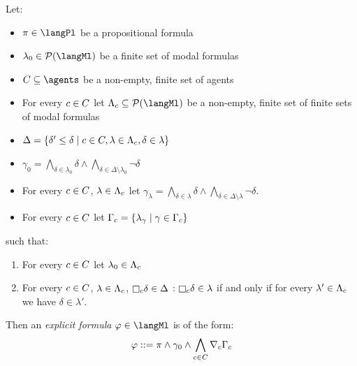 \begin{definition}\label{explicit-formulas}
Let:
\begin{itemize}
    \item $\pi \in \langPl$ be a propositional formula
    \item $\lambda_0 \in \powerset(\langMl)$ be a finite set of modal formulas
    \item $\agentsC \subseteq \agents$ be a non-empty, finite set of agents
    \item For every $c \in C$ let $\Lambda_\agentC \subseteq \powerset(\langMl)$ be a non-empty, finite set of finite sets of modal formulas
    \item $\Delta = \{\delta' \leq \delta \mid c \in C, \lambda \in \Lambda_c, \delta \in \lambda\}$
    \item $\gamma_0 = \bigwedge_{\delta \in \lambda_0} \delta \land \bigwedge_{\delta \in \Delta \setminus \lambda_0} \lnot \delta$
    \item For every $c \in C$, $\lambda \in \Lambda_c$ let $\gamma_\lambda = \bigwedge_{\delta \in \lambda} \delta \land \bigwedge_{\delta \in \Delta \setminus \lambda} \lnot \delta$.
    \item For every $c \in C$ let $\Gamma_c = \{\lambda_\gamma \mid \gamma \in \Gamma_c\}$
\end{itemize}
such that:
\begin{enumerate}
    \item For every $c \in C$ let $\lambda_0 \in \Lambda_c$
    \item For every $c \in C$, $\lambda \in \Lambda_c$, $\necessaryC \delta \in \Delta$ : $\necessaryC \delta \in \lambda$ if and only if for every $\lambda' \in \Lambda_c$ we have $\delta \in \lambda'$.
\end{enumerate}

Then an {\em explicit formula} $\phi \in \langMl$ is of the form:
$$
\varphi ::= \pi \land \gamma_0 \land \bigwedge_{c \in C} \nabla_{c} \Gamma_c
$$
\end{definition}

